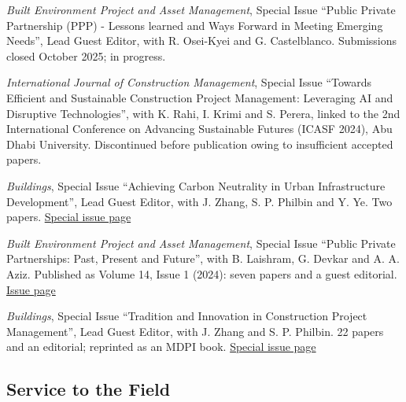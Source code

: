 \documentclass[11pt,a4paper]{report} %
\begin{document}
    \begin{tablist}

        \item[2025--26] \tab{}\textit{Built Environment Project and Asset Management}, Special Issue \enquote{Public Private Partnership (PPP) - Lessons learned and Ways Forward in Meeting Emerging Needs}, Lead Guest Editor, with R. Osei-Kyei and G. Castelblanco. Submissions closed October 2025; in progress.

        \item[2024--25] \tab{}\textit{International Journal of Construction Management}, Special Issue \enquote{Towards Efficient and Sustainable Construction Project Management: Leveraging AI and Disruptive Technologies}, with K. Rahi, I. Krimi and S. Perera, linked to the 2nd International Conference on Advancing Sustainable Futures (ICASF 2024), Abu Dhabi University. Discontinued before publication owing to insufficient accepted papers.

        \item[2023--24] \tab{}\textit{Buildings}, Special Issue \enquote{Achieving Carbon Neutrality in Urban Infrastructure Development}, Lead Guest Editor, with J. Zhang, S. P. Philbin and Y. Ye. Two papers. \href{https://www.mdpi.com/journal/buildings/special_issues/157825OQHP}{Special issue page}

        \item[2023--24] \tab{}\textit{Built Environment Project and Asset Management}, Special Issue \enquote{Public Private Partnerships: Past, Present and Future}, with B. Laishram, G. Devkar and A. A. Aziz. Published as Volume 14, Issue 1 (2024): seven papers and a guest editorial. \href{https://www.emerald.com/bepam/issue/14/1}{Issue page}

        \item[2022--23] \tab{}\textit{Buildings}, Special Issue \enquote{Tradition and Innovation in Construction Project Management}, Lead Guest Editor, with J. Zhang and S. P. Philbin. 22 papers and an editorial; reprinted as an MDPI book. \href{https://www.mdpi.com/journal/buildings/special_issues/tradition_innovation_construction_management}{Special issue page}

    \end{tablist}

    \subsection*{Service to the Field}
\end{document}
